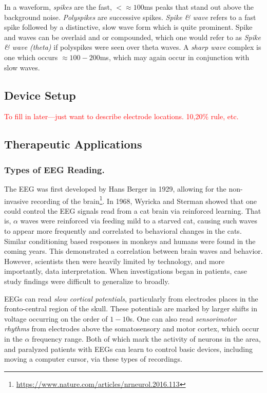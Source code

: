 In a waveform, \textit{spikes} are the fast, $<\approx100$ms peaks that stand out above the background noise. \textit{Polyspikes} are successive spikes. \textit{Spike \& wave} refers to a fast spike followed by a distinctive, slow wave form which is quite prominent. Spike and waves can be overlaid and or compounded, which one would refer to as \textit{Spike \& wave (theta)} if polyspikes were seen over theta waves. A \textit{sharp wave} complex is one which occurs $\approx 100-200$ms, which may again occur in conjunction with slow waves. 

\subsection{Device Setup}

\textcolor{red}{To fill in later---just want to describe electrode locations. 10,20\% rule, etc. }


\subsection{Therapeutic Applications}

\subsubsection{Types of EEG Reading.}

The EEG was first developed by Hans Berger in 1929, allowing for the non-invasive recording of the brain\footnote{\url{https://www.nature.com/articles/nrneurol.2016.113}}. In 1968, Wyricka and Sterman showed that one could control the EEG signals read from a cat brain via reinforced learning. That is, $\alpha$ waves were reinforced via feeding mild to a starved cat, causing such waves to appear more frequently and correlated to behavioral changes in the cats. Similar conditioning based responses in monkeys and humans were found in the coming years. This demonstrated a correlation between brain waves and behavior. However, scientists then were heavily limited by technology, and more importantly, data interpretation. When investigations began in patients, case study findings were difficult to generalize to broadly. \newline

EEGs can read \textit{slow cortical potentials}, particularly from electrodes places in the fronto-central region of the skull. These potentials are marked by larger shifts in voltage occurring on the order of $1-10$s. One can also read \textit{sensorimotor rhythms} from electrodes above the somatosensory and motor cortex, which occur in the $\alpha$ frequency range. Both of which mark the activity of neurons in the area, and paralyzed patients with EEGs can learn to control basic devices, including moving a computer cursor, via these types of recordings. \newline

